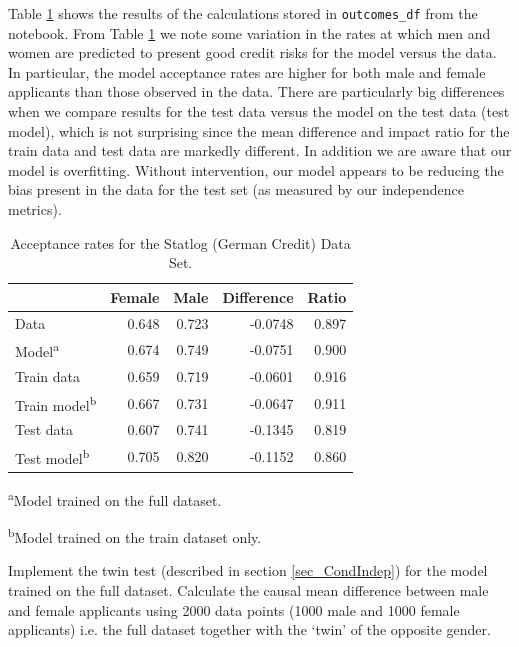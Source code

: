 Table \ref{tab_IndependenceMetrics} shows the results of the calculations stored in \texttt{outcomes\_df} from the notebook. From Table \ref{tab_IndependenceMetrics} we note some variation in the rates at which men and women are predicted to present good credit risks for the model versus the data. In particular, the model acceptance rates are higher for both male and female applicants than those observed in the data. There are particularly big differences when we compare results for the test data versus the model on the test data (test model), which is not surprising since the mean difference and impact ratio for the train data and test data are markedly different. In addition we are aware that our model is overfitting. Without intervention, our model appears to be reducing the bias present in the data for the test set (as measured by our independence metrics).
%
\begin{table}[h!]
{\centering
\caption{Acceptance rates for the Statlog (German Credit) Data Set.}
\label{tab_IndependenceMetrics}
\vspace{10pt}
\begin{tabular}{|l|r|r|r|r|}
\hline
                               & Female & Male  & Difference & Ratio \\
\hline
\hline
Data                           & 0.648  & 0.723 & -0.0748    & 0.897 \\
Model\textsuperscript{a}       & 0.674  & 0.749 & -0.0751    & 0.900 \\
\hline
Train data                     & 0.659  & 0.719 & -0.0601    & 0.916 \\
Train model\textsuperscript{b} & 0.667  & 0.731 & -0.0647    & 0.911 \\
\hline
Test data                      & 0.607  & 0.741 & -0.1345    & 0.819 \\
Test model\textsuperscript{b}  & 0.705  & 0.820 & -0.1152    & 0.860 \\
\hline
\end{tabular}\par}
\vspace{4pt}
\footnotesize
\hspace{1.5em}\textsuperscript{a}Model trained on the full dataset.

\hspace{1.5em}\textsuperscript{b}Model trained on the train dataset only.
\end{table}


\begin{lookbox}
Implement the twin test (described in section \ref{sec_CondIndep}) for the model trained on the full dataset. Calculate the causal mean difference between male and female applicants using 2000 data points (1000 male and 1000 female applicants) i.e. the full dataset together with the `twin' of the opposite gender.
\end{lookbox}

